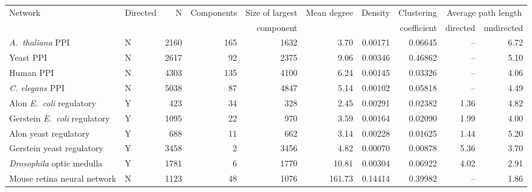 \begin{tabular}{llrrrrrrrr}
\hline
Network & Directed & N  &   Components &  Size of largest &Mean degree     &    Density & Clustering  & \multicolumn{2}{c}{Average path length}\\
        &          &    &              &  component       &                &            &  coefficient & directed & undirected \\
\hline
\textit{A.~thaliana} PPI & N & 2160 & 165 & 1632 & 3.70 & 0.00171 & 0.06645 & -- & 6.72\\
Yeast PPI & N & 2617 & 92 & 2375 & 9.06 & 0.00346 & 0.46862 & -- & 5.10\\
Human PPI & N & 4303 & 135 & 4100 & 6.24 & 0.00145 & 0.03326 & -- & 4.06\\
\textit{C. elegans} PPI & N & 5038 & 87 & 4847 & 5.14 & 0.00102 & 0.05818 & -- & 4.49\\
Alon \textit{E.~coli} regulatory & Y & 423 & 34 & 328 & 2.45 & 0.00291 & 0.02382 & 1.36 & 4.82\\
Gerstein \textit{E.~coli} regulatory & Y & 1095 & 22 & 970 & 3.59 & 0.00164 & 0.02090 & 1.99 & 4.00\\
Alon yeast regulatory & Y & 688 & 11 & 662 & 3.14 & 0.00228 & 0.01625 & 1.44 & 5.20\\
Gerstein yeast regulatory & Y & 3458 & 2 & 3456 & 4.82 & 0.00070 & 0.00878 & 5.36 & 3.70\\
\textit{Drosophila} optic medulla & Y & 1781 & 6 & 1770 & 10.81 & 0.00304 & 0.06922 & 4.02 & 2.91\\
Mouse retina neural network & N & 1123 & 48 & 1076 & 161.73 & 0.14414 & 0.39982 & -- & 1.86\\
\hline
\end{tabular}
